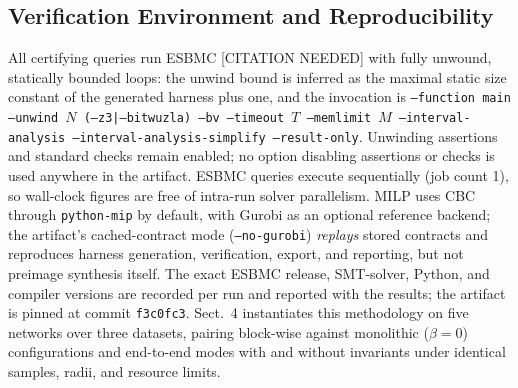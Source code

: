 \subsection{Verification Environment and Reproducibility}
\label{sec:repro}
 
All certifying queries run ESBMC [CITATION NEEDED] with fully unwound,
statically bounded loops: the unwind bound is inferred as the maximal
static size constant of the generated harness plus one, and the
invocation is
\texttt{--function main --unwind $N$ (--z3|--bitwuzla) --bv --timeout
$T$ --memlimit $M$ --interval-analysis --interval-analysis-simplify
--result-only}. Unwinding assertions and standard checks remain
enabled; no option disabling assertions or checks is used anywhere in
the artifact. ESBMC queries execute sequentially (job count 1), so
wall-clock figures are free of intra-run solver parallelism. MILP uses
CBC through \texttt{python-mip} by default, with Gurobi as an optional
reference backend; the artifact's cached-contract mode
(\texttt{--no-gurobi}) \emph{replays} stored contracts and reproduces
harness generation, verification, export, and reporting, but not
preimage synthesis itself. The exact ESBMC release, SMT-solver,
Python, and compiler versions are recorded per run and reported with
the results; the artifact is pinned at commit
\texttt{f3c0fc3}. Sect.~4 instantiates this methodology on five
networks over three datasets, pairing block-wise against monolithic
($\beta = 0$) configurations and end-to-end modes with and without
invariants under identical samples, radii, and resource limits.